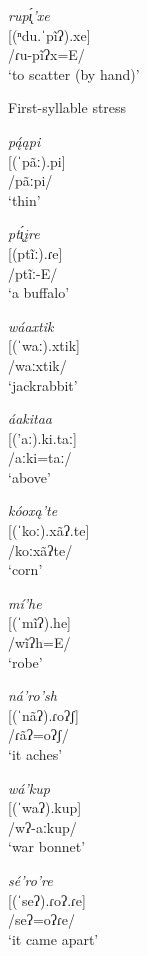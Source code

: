 \begin{exe}
\begin{xlist}
\item \textit{rup\'{ı̨}'xe}\\
    {[}(ⁿdu.ˈpĩʔ).xe]\\
    /ɾu-pĩʔx=E/\\
    `to scatter (by hand)'

\end{xlist}

\item\label{firstsyllable} First-syllable stress

\begin{xlist}

\item \textit{pą́ąpi}\\
    {[}(ˈpãː).pi]\\
    /pãːpi/\\
    `thin'

\item \textit{pt\'{ı̨}įre}\\
    {[}(ptĩː).ɾe]\\
    /ptĩː-E/\\
    `a buffalo'

\item \textit{wáaxtik}\\
    {[}(ˈwaː).xtik]\\
    /waːxtik/\\
    `jackrabbit'

\item \textit{áakitaa}\\
    {[}('aː).ki.taː]\\
    /aːki=taː/\\
    `above'

\item \textit{kóoxą'te}\\
    {[}(ˈkoː).xãʔ.te]\\
    /koːxãʔte/\\
    `corn'

\item \textit{mí'he}\\
    {[}(ˈmĩʔ).he]\\
    /wĩʔh=E/\\
    `robe'

\item \textit{ná'ro'sh}\\
    {[}(ˈnãʔ).ɾoʔʃ]\\
    /ɾãʔ=oʔʃ/\\
    `it aches'

\item \textit{wá'kup}\\
    {[}(ˈwaʔ).kup]\\
    /wʔ-aːkup/\\
    `war bonnet'

\item \textit{sé'ro're}\\
    {[}(ˈseʔ).ɾoʔ.ɾe]\\
    /seʔ=oʔɾe/\\
    `it came apart'

\end{xlist}

\end{exe}



